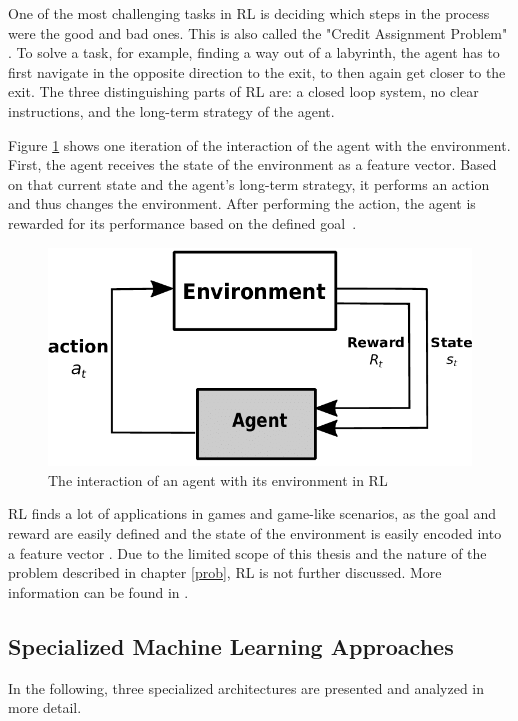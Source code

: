 One of the most challenging tasks in RL is deciding which steps in the process were the good and bad ones. This is also called the "Credit Assignment Problem" \cite{Minsky,Bishop}. To solve a task, for example, finding a way out of a labyrinth, the agent has to first navigate in the opposite direction to the exit, to then again get closer to the exit. The three distinguishing parts of RL are: a closed loop system, no clear instructions, and the long-term strategy of the agent. \cite{Sutton}

Figure \ref{fig:SimpleRL} shows one iteration of the interaction of the agent with the environment. First, the agent receives the state of the environment as a feature vector. Based on that current state and the agent's long-term strategy, it performs an action and thus changes the environment. After performing the action, the agent is rewarded for its performance based on the defined goal~\cite{LEX}.

\begin{figure}[H]
	\centering
	\includegraphics[width=0.5\linewidth]{IMGs/SimpleRL.png}
	\caption{The interaction of an agent with its environment in RL \cite{LEX}}
	\label{fig:SimpleRL}
\end{figure}
RL finds a lot of applications in games and game-like scenarios, as the goal and reward are easily defined and the state of the environment is easily encoded into a feature vector \cite{Takuma}.
Due to the limited scope of this thesis and the nature of the problem described in chapter \ref{prob}, RL is not further discussed. More information can be found in \cite{Sutton}.
 

\subsection{Specialized Machine Learning Approaches}
In the following, three specialized architectures are presented and analyzed in more detail.

